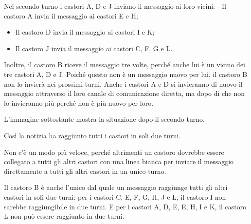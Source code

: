 {{{\centering%
\par}

Nel secondo turno i castori A, D e J inviano il messaggio ai loro vicini: - Il castoro A invia il messaggio ai castori E e H;

\begin{itemize}
  \item Il castoro D invia il messaggio ai castori I e K;
  \item Il castoro J invia il messaggio ai castori C, F, G e L.
\end{itemize}

Inoltre, il castoro B riceve il messaggio tre volte, perché anche lui è un vicino dei tre castori A, D e J. Poiché questo non è un messaggio nuovo per lui, il castoro B non lo invierà nei prossimi turni. Anche i castori A e D si invieranno di nuovo il messaggio attraverso il loro canale di comunicazione diretta, ma dopo di che non lo invieranno più perché non è più nuovo per loro.

\begin{samepage}
L’immagine sottostante mostra la situazione dopo il secondo turno.

\nopagebreak

{\centering%
\par}
\end{samepage}

Così la notizia ha raggiunto tutti i castori in soli due turni.

Non c’è un modo più veloce, perché altrimenti un castoro dovrebbe essere collegato a tutti gli altri castori con una linea bianca per inviare il messaggio direttamente a tutti gli altri castori in un unico turno.

Il castoro B è anche l’unico dal quale un messaggio raggiunge tutti gli altri castori in soli due turni: per i castori C, E, F, G, H, J e L, il castoro I non sarebbe raggiungibile in due turni. E per i castori A, D, E, E, H, I e K, il castoro L non può essere raggiunto in due turni.



}}
